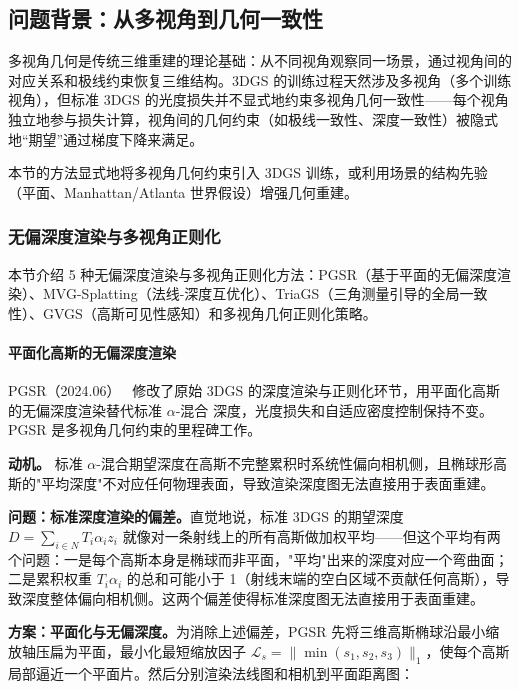 \subsection{问题背景：从多视角到几何一致性}

多视角几何是传统三维重建的理论基础：从不同视角观察同一场景，通过视角间的对应关系和极线约束恢复三维结构。3DGS 的训练过程天然涉及多视角（多个训练视角），但标准 3DGS 的光度损失并不显式地约束多视角几何一致性——每个视角独立地参与损失计算，视角间的几何约束（如极线一致性、深度一致性）被隐式地“期望”通过梯度下降来满足。

本节的方法显式地将多视角几何约束引入 3DGS 训练，或利用场景的结构先验（平面、Manhattan/Atlanta 世界假设）增强几何重建。

\subsubsection{无偏深度渲染与多视角正则化}

本节介绍 5 种无偏深度渲染与多视角正则化方法：PGSR（基于平面的无偏深度渲染）、MVG-Splatting（法线-深度互优化）、TriaGS（三角测量引导的全局一致性）、GVGS（高斯可见性感知）和多视角几何正则化策略。

\paragraph{平面化高斯的无偏深度渲染}

PGSR（2024.06）~\cite{2406_06521} 修改了原始 3DGS 的深度渲染与正则化环节，用平面化高斯的无偏深度渲染替代标准 $\alpha$-混合 深度，光度损失和自适应密度控制保持不变。PGSR 是多视角几何约束的里程碑工作。

\textbf{动机。} 标准 $\alpha$-混合期望深度在高斯不完整累积时系统性偏向相机侧，且椭球形高斯的"平均深度"不对应任何物理表面，导致渲染深度图无法直接用于表面重建。

\textbf{问题：标准深度渲染的偏差。}直觉地说，标准 3DGS 的期望深度 $D = \sum_{i \in N} T_i \alpha_i z_i$ 就像对一条射线上的所有高斯做加权平均——但这个平均有两个问题：一是每个高斯本身是椭球而非平面，"平均"出来的深度对应一个弯曲面；二是累积权重 $T_i \alpha_i$ 的总和可能小于 1（射线末端的空白区域不贡献任何高斯），导致深度整体偏向相机侧。这两个偏差使得标准深度图无法直接用于表面重建。

\textbf{方案：平面化与无偏深度。}为消除上述偏差，PGSR 先将三维高斯椭球沿最小缩放轴压扁为平面，最小化最短缩放因子 $\mathcal{L}_s = \|\min(s_1, s_2, s_3)\|_1$，使每个高斯局部逼近一个平面片。然后分别渲染法线图和相机到平面距离图：

